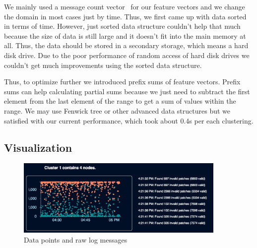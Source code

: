 \documentclass[conference]{style/acmsiggraph}
\begin{document}
We mainly used a message count vector~\cite{Xu09} for our feature vectors and we change the domain
in most cases just by time. Thus, we first came up with data sorted in terms of time. However, just
sorted data structure couldn't help that much because the size of data is still large and it doesn't
fit into the main memory at all. Thus, the data should be stored in a secondary storage, which means
a hard disk drive. Due to the poor performance of random access of hard disk drives we couldn't get
much improvements using the sorted data structure.

Thus, to optimize further we introduced prefix sums of feature vectors. Prefix sums can help
calculating partial sums because we just need to subtract the first element from the last element of
the range to get a sum of values within the range.  We may use Fenwick tree \cite{Fenwick94} or
other advanced data structures but we satisfied with our current performance, which took about 0.4s
per each clustering.

\subsection{Visualization}
\begin{figure}[p]
    \centering
    \includegraphics[width=0.9\textwidth]{images/screenshot_plot.png}
    \caption{Data points and raw log messages}
    \label{fig:ss_plot}
\end{figure}
\end{document}
